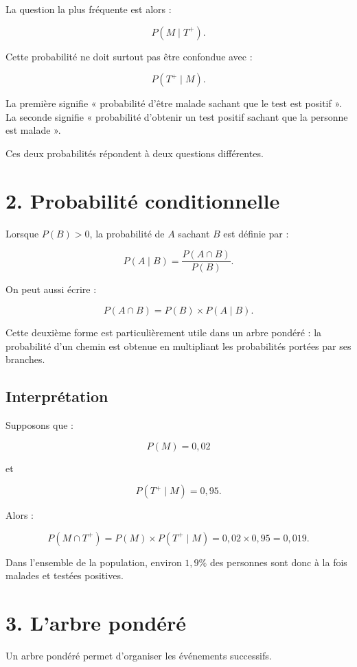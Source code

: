 La question la plus fréquente est alors :

\[
P(M\mid T^+).
\]

Cette probabilité ne doit surtout pas être confondue avec :

\[
P(T^+\mid M).
\]

La première signifie « probabilité d'être malade sachant que le test est positif ».  
La seconde signifie « probabilité d'obtenir un test positif sachant que la personne est malade ».

Ces deux probabilités répondent à deux questions différentes.


\section{2. Probabilité conditionnelle}

Lorsque $P(B)>0$, la probabilité de $A$ sachant $B$ est définie par :

\[
P(A\mid B)=\frac{P(A\cap B)}{P(B)}.
\]

On peut aussi écrire :

\[
P(A\cap B)=P(B)\times P(A\mid B).
\]

Cette deuxième forme est particulièrement utile dans un arbre pondéré : la probabilité d'un chemin est obtenue en multipliant les probabilités portées par ses branches.

\subsection{Interprétation}

Supposons que :

\[
P(M)=0{,}02
\]

et

\[
P(T^+\mid M)=0{,}95.
\]

Alors :

\[
P(M\cap T^+)=P(M)\times P(T^+\mid M)
=0{,}02\times0{,}95
=0{,}019.
\]

Dans l'ensemble de la population, environ $1{,}9\%$ des personnes sont donc à la fois malades et testées positives.


\section{3. L'arbre pondéré}

Un arbre pondéré permet d'organiser les événements successifs.


